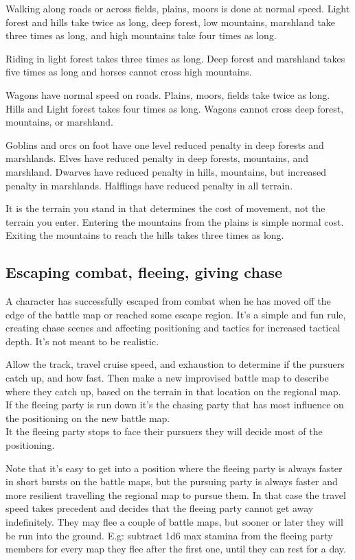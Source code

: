 Walking along roads or across fields, plains, moors is done at normal speed. Light forest and hills take twice as long, deep forest, low mountains, marshland take three times as long, and high mountains take four times as long.

Riding in light forest takes three times as long. Deep forest and marshland takes five times as long and horses cannot cross high mountains.

Wagons have normal speed on roads. Plains, moors, fields take twice as long. Hills and Light forest takes four times as long. Wagons cannot cross deep forest, mountains, or marshland.

Goblins and orcs on foot have one level reduced penalty in deep forests and marshlands. Elves have reduced penalty in deep forests, mountains, and marshland. Dwarves have reduced penalty in hills, mountains, but increased penalty in marshlands. Halflings have reduced penalty in all terrain.

It is the terrain you stand in that determines the cost of movement, not the terrain you enter. Entering the mountains from the plains is simple normal cost. Exiting the mountains to reach the hills takes three times as long.


\subsection*{Escaping combat, fleeing, giving chase}
A character has successfully escaped from combat when he has moved off the edge of the battle map or reached some escape region. It's a simple and fun rule, creating chase scenes and affecting positioning and tactics for increased tactical depth. It's not meant to be realistic.

Allow the track, travel cruise speed, and exhaustion to determine if the pursuers catch up, and how fast. Then make a new improvised battle map to describe where they catch up, based on the terrain in that location on the regional map.\\
If the fleeing party is run down it's the chasing party that has most influence on the positioning on the new battle map.\\
It the fleeing party stops to face their pursuers they will decide most of the positioning.

Note that it's easy to get into a position where the fleeing party is always faster in short bursts on the battle maps, but the pursuing party is always faster and more resilient travelling the regional map to pursue them. In that case the travel speed takes precedent and decides that the fleeing party cannot get away indefinitely. They may flee a couple of battle maps, but sooner or later they will be run into the ground. E.g: subtract 1d6 max stamina from the fleeing party members for every map they flee after the first one, until they can rest for a day.

